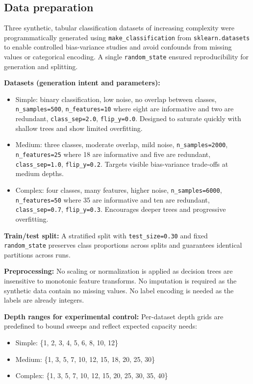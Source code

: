 \documentclass[conference]{IEEEtran}
\begin{document}
\subsection{Data preparation}
Three synthetic, tabular classification datasets of increasing complexity were programmatically generated using 
\texttt{make\_classification} from \texttt{sklearn.datasets} \cite{scikit-learn} to enable controlled bias-variance studies and
 avoid confounds from missing values or categorical encoding. A single \texttt{random\_state} ensured reproducibility for generation and splitting.

\textbf{Datasets (generation intent and parameters):}
\begin{itemize}
  \item Simple: binary classification, low noise, no overlap between classes, \texttt{n\_samples=500}, \texttt{n\_features=10} where eight are informative and two are redundant, \texttt{class\_sep=2.0}, \texttt{flip\_y=0.0}. Designed to saturate quickly with shallow trees and show limited overfitting.
  \item Medium: three classes, moderate overlap, mild noise, \texttt{n\_samples=2000}, \texttt{n\_features=25} where 18 are informative and five are redundant, \texttt{class\_sep=1.0}, \texttt{flip\_y=0.2}. Targets visible bias-variance trade-offs at medium depths.
  \item Complex: four classes, many features, higher noise, \texttt{n\_samples=6000}, \texttt{n\_features=50} where 35 are informative and ten are redundant, \texttt{class\_sep=0.7}, \texttt{flip\_y=0.3}. Encourages deeper trees and progressive overfitting.
\end{itemize}

\textbf{Train/test split:} A stratified split with \texttt{test\_size=0.30} and fixed \texttt{random\_state} preserves 
class proportions across splits and guarantees identical partitions across runs.


\textbf{Preprocessing:} No scaling or normalization is applied as decision trees are insensitive to monotonic feature transforms. No imputation is
 required as the synthetic data contain no missing values. No label encoding is needed as the labels are already integers.

\textbf{Depth ranges for experimental control:} Per-dataset depth grids are predefined to bound sweeps and reflect expected capacity needs:
\begin{itemize}
  \item Simple: \{1, 2, 3, 4, 5, 6, 8, 10, 12\}
  \item Medium: \{1, 3, 5, 7, 10, 12, 15, 18, 20, 25, 30\}
  \item Complex: \{1, 3, 5, 7, 10, 12, 15, 20, 25, 30, 35, 40\}
\end{itemize}
\end{document}
